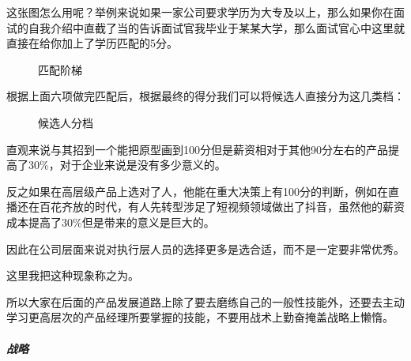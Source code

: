 \documentclass[letterpaper,11pt,english]{sphinxmanual}
\begin{document}
这张图怎么用呢？举例来说如果一家公司要求学历为大专及以上，那么如果你在面试的自我介绍中直截了当的告诉面试官我毕业于某某大学，那么面试官心中这里就直接在给你加上了学历匹配的5分。

\begin{figure}[H]
\centering
\capstart

\noindent{}
\caption{匹配阶梯}\label{\detokenize{chapter_interview/question:id12}}\end{figure}

根据上面六项做完匹配后，根据最终的得分我们可以将候选人直接分为这几类档：

\begin{figure}[H]
\centering
\capstart

\noindent{}
\caption{候选人分档}\label{\detokenize{chapter_interview/question:id13}}\end{figure}

直观来说与其招到一个能把原型画到100分但是薪资相对于其他90分左右的产品提高了30\%，对于企业来说是没有多少意义的。

反之如果在高层级产品上选对了人，他能在重大决策上有100分的判断，例如在直播还在百花齐放的时代，有人先转型涉足了短视频领域做出了抖音，虽然他的薪资成本提高了30\%但是带来的意义是巨大的。

因此在公司层面来说对执行层人员的选择更多是选合适，而不是一定要非常优秀。

这里我把这种现象称之为。

所以大家在后面的产品发展道路上除了要去磨练自己的一般性技能外，还要去主动学习更高层次的产品经理所要掌握的技能，不要用战术上勤奋掩盖战略上懒惰。


\subparagraph{战略}
\label{\detokenize{chapter_interview/question:id6}}
\end{document}
